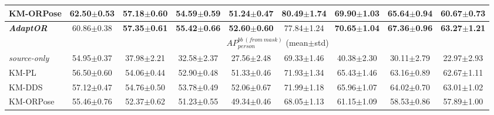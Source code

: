 \begin{table*}[t]
{\begin{tabular}{l|cccc|cccc}
			KM-ORPose                & \textbf{62.50$\pm$0.53}                                                                               & 57.18$\pm$0.60                                                  & 54.59$\pm$0.59          & 51.24$\pm$0.47          & \textbf{80.49$\pm$1.74} & 69.90$\pm$1.03          & 65.64$\pm$0.94          & 60.67$\pm$0.73 \Tstrut          \\ \hline
			\emph{\textbf{AdaptOR}}  & 60.86$\pm$0.38                                                                                        & \textbf{57.35$\pm$0.61}                                         & \textbf{55.42$\pm$0.66} & \textbf{52.60$\pm$0.60} & 77.84$\pm$1.24          & \textbf{70.65$\pm$1.04} & \textbf{67.36$\pm$0.96} & \textbf{63.27$\pm$1.21} \Tstrut \\
			\hline
			                         & \multicolumn{8}{c}{$\mathit{AP_{person}^{bb\ (from\ mask)}}$ (mean$\pm$std)} \Tstrut \Bstrut                                                                                                                                                                                                                                       \\
			\hline
			\emph{source-only}       & 54.95$\pm$0.37                                                                                        & 37.98$\pm$2.21                                                  & 32.58$\pm$2.37          & 27.56$\pm$2.48          & 69.33$\pm$1.46          & 40.38$\pm$2.30          & 30.11$\pm$2.79          & 22.97$\pm$2.93  \Tstrut         \\\hline
			KM-PL                    & 56.50$\pm$0.60                                                                                        & 54.06$\pm$0.44                                                  & 52.90$\pm$0.48          & 51.33$\pm$0.46          & 71.93$\pm$1.34          & 65.43$\pm$1.46          & 63.16$\pm$0.89          & 62.67$\pm$1.11 \Tstrut          \\
			KM-DDS                   & 57.12$\pm$0.47                                                                                        & 54.76$\pm$0.50                                                  & 53.78$\pm$0.49          & 52.06$\pm$0.67          & 71.99$\pm$1.18          & 65.96$\pm$1.07          & 64.02$\pm$0.70          & 63.01$\pm$1.02 \Tstrut          \\
			KM-ORPose                & 55.46$\pm$0.76                                                                                        & 52.37$\pm$0.62                                                  & 51.23$\pm$0.55          & 49.34$\pm$0.46          & 68.05$\pm$1.13          & 61.15$\pm$1.09          & 58.53$\pm$0.86          & 57.89$\pm$1.00 \Tstrut          \\\hline

\end{tabular}}
\end{table*}
